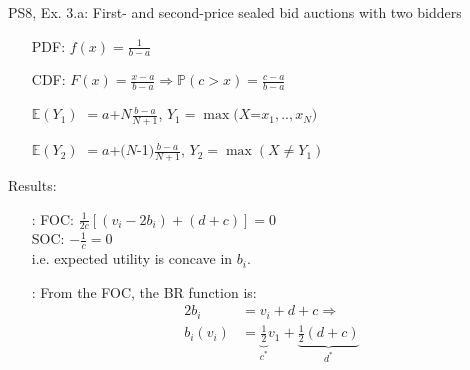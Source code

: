 \begin{frame}{PS8, Ex. 3.a: First- and second-price sealed bid auctions with two bidders}
\begin{multicols}{2}
\begin{enumerate}
        \item[PDF:] $f(x)=\frac{1}{b-a}$
        \item[CDF:] $F(x)=\frac{x-a}{b-a}\Rightarrow\mathbb{P}(c>x)=\frac{c-a}{b-a}$
        \item[$\mathbb{E}(Y_1)$] $=a$+$N\frac{b-a}{N+1}$, $Y_1=\max(X$=$x_1,..,x_N)$
        \item[$\mathbb{E}(Y_2)$] $=a$+$(N$-1$)\frac{b-a}{N+1}$, $Y_2=\max(X\neq Y_1)$
      \end{enumerate}
      \vspace{-6pt}
      Results:
      \vspace{-6pt}
      \begin{itemize}
        \item[\nth{2}:] FOC: $\frac{1}{2c}[(v_i-2b_i)+(d+c)]=0$\\
                        SOC: $-\frac{1}{c}=0$\\
                        i.e. expected utility is concave in $b_i$.
        \item[\nth{3}:] From the FOC, the BR function is:\vspace{-6pt}
                        \begin{align*}
                          2b_i&=v_i+d+c\Rightarrow\\
                          b_i(v_i)&=\underbrace{\frac{1}{2}}_{c^*}v_1+\underbrace{\frac{1}{2}(d+c)}_{d^*}
                        \end{align*}
      \end{itemize}
      \vfill\null
    \end{multicols}
\end{frame}
